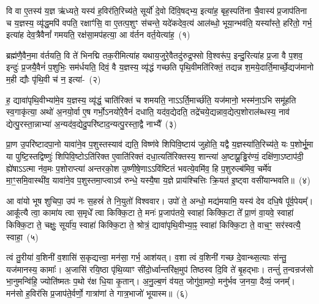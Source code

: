 \setcounter{anuvakam}{0}
वि वा ए॒तस्य॑ य॒ज्ञ ऋ॑ध्यते॒ यस्य॑ ह॒विर॑ति॒रिच्य॑ते॒ सूर्यो॑ दे॒वो दि॑वि॒षद्भ्य॒ इत्या॑ह॒ बृह॒स्पति॑ना चै॒वास्य॑ प्र॒जा\-प॑तिना च य॒ज्ञस्य॒ व्यृ॑द्ध॒मपि॑ वपति॒ रक्षाꣳ॑सि॒ वा ए॒तत्प॒शुꣳ स॑चन्ते॒ यदे॑कदेव॒त्य॑ आल॑ब्धो॒ भूया॒न्भव॑ति॒ यस्या᳚स्ते॒ हरि॑तो॒ गर्भ॒ इत्या॑ह देव॒त्रैवैनां᳚ गमयति॒ रक्ष॑सा॒मप॑हत्या॒ आ व॑र्तन वर्त॒येत्या॑ह॒~(१)\ip

ब्रह्म॑णै॒वैन॒मा व॑र्तयति॒ वि ते॑ भिनद्मि तक॒रीमित्या॑ह यथाय॒जुरे॒वैतदु॑रुद्र॒फ्सो वि॒श्वरू॑प॒ इन्दु॒रित्या॑ह प्र॒जा वै प॒शव॒ इन्दुः॑ प्र॒जयै॒वैनं॑ प॒शुभिः॒ सम॑र्धयति॒ दिवं॒ वै य॒ज्ञस्य॒ व्यृ॑द्धं गच्छति पृथि॒वीमति॑रिक्तं॒ तद्यन्न श॒मये॒दार्ति॒मार्च्छे॒द्यज॑मानो म॒ही द्यौः पृ॑थि॒वी च॑ न॒ इत्या॑-~(२)\ip

ह॒ द्यावा॑\-पृथि॒वीभ्या॑मे॒व य॒ज्ञस्य॒ व्यृ॑द्धं॒ चाति॑रिक्तं च शमयति॒ नाऽऽर्ति॒मार्च्छ॑ति॒ यज॑मानो॒ भस्म॑ना॒\-ऽभि समू॑हति स्व॒गाकृ॑त्या॒ अथो॑ अ॒नयो॒र्वा ए॒ष गर्भो॒\-ऽनयो॑रे॒वैनं॑ दधाति॒ यद॑व॒द्येदति॒ तद्रे॑चये॒द्यन्नाव॒द्येत्प॒शोराल॑ब्धस्य॒ नाव॑ द्येत्पु॒रस्ता॒न्नाभ्या॑ अ॒न्यद॑व॒द्येदु॒परि॑ष्टाद॒न्यत्पु॒रस्ता॒द्वै नाभ्यै᳚~(३)\ip

प्रा॒ण उ॒परि॑ष्टादपा॒नो यावा॑ने॒व प॒शुस्तस्याव॑ द्यति॒ विष्ण॑वे शिपिवि॒ष्टाय॑ जुहोति॒ यद्वै य॒ज्ञस्या॑ति॒रिच्य॑ते॒ यः प॒शोर्भू॒मा या पुष्टि॒स्तद्विष्णुः॑ शिपिवि॒ष्टो\-ऽति॑रिक्त ए॒वाति॑रिक्तं दधा॒त्यति॑रिक्तस्य॒ शान्त्या॑ अ॒ष्टाप्रू॒ड्ढिर॑ण्यं॒ दक्षि॑णा॒\-ऽष्टाप॑दी॒ ह्ये॑षा\-ऽऽ\-\-त्मा न॑व॒मः प॒शोराप्त्या॑ अन्तरको॒श उ॒ष्णीषे॒णा\-ऽऽ\-\-वि॑ष्टितं भवत्ये॒वमि॑व॒ हि प॒शुरुल्ब॑मिव॒ चर्मे॑व मा॒ꣳ॒समि॒वास्थी॑व॒ यावा॑ने॒व प॒शुस्तमा॒प्त्वा\-ऽ\-व॑ रुन्धे॒ यस्यै॒षा य॒ज्ञे प्राय॑श्चित्तिः क्रि॒यत॑ इ॒ष्ट्वा वसी॑यान्भवति॥~(४)\ip

{\anuvakamend[{व॒र्त॒येत्या॑ह न॒ इति॒ वै नाभ्या॒ उल्ब॑मि॒वैक॑विꣳशतिश्च}]}

आ वा॑यो भूष शुचिपा॒ उप॑ नः स॒हस्रं॑ ते नि॒युतो॑ विश्ववार। उपो॑ ते॒ अन्धो॒ मद्य॑मयामि॒ यस्य॑ देव दधि॒षे पू᳚र्व॒पेयम्᳚। आकू᳚त्यै त्वा॒ कामा॑य त्वा स॒मृधे᳚ त्वा किक्कि॒टा ते॒ मनः॑ प्र॒जा\-प॑तये॒ स्वाहा॑ किक्कि॒टा ते᳚ प्रा॒णं वा॒यवे॒ स्वाहा॑ किक्कि॒टा ते॒ चक्षुः॒ सूर्या॑य॒ स्वाहा॑ किक्कि॒टा ते॒ श्रोत्रं॒ द्यावा॑\-पृथि॒वीभ्या॒ꣴ॒ स्वाहा॑ किक्कि॒टा ते॒ वाच॒ꣳ॒ सर॑स्वत्यै॒ स्वाहा॒~(५)\ip

त्वं तु॒रीया॑ व॒शिनी॑ व॒शासि॑ स॒कृद्यत्त्वा॒ मन॑सा॒ गर्भ॒ आश॑यत्। व॒शा त्वं व॒शिनी॑ गच्छ दे॒वान्थ्स॒त्याः स॑न्तु॒ यज॑मानस्य॒ कामाः᳚। अ॒जासि॑ रयि॒ष्ठा पृ॑थि॒व्याꣳ सी॑दो॒र्ध्वान्तरि॑क्ष॒मुप॑ तिष्ठस्व दि॒वि ते॑ बृ॒हद्भाः। तन्तुं॑ त॒न्वन्रज॑सो भा॒नुमन्वि॑हि॒ ज्योति॑ष्मतः प॒थो र॑क्ष धि॒या कृ॒तान्। अ॒नु॒ल्ब॒णं व॑यत॒ जोगु॑वा॒मपो॒ मनु॑र्भव ज॒नया॒ दैव्यं॒ जनम्᳚। मन॑सो ह॒विर॑सि प्र॒जा\-प॑ते॒र्वर्णो॒ गात्रा॑णां ते गात्र॒भाजो॑ भूयास्म॥~(६)\ip

